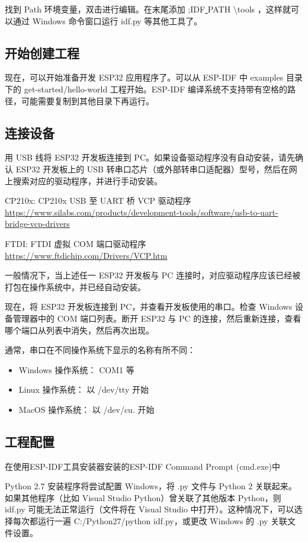 找到 Path 环境变量，双击进行编辑。在末尾添加 ;IDF\underline{ }PATH \backslash tools ，这样就可以通过 Windows 命令窗口运行 idf.py 等其他工具了。

\subsection{开始创建工程}

现在，可以开始准备开发 ESP32 应用程序了。可以从 ESP-IDF 中 examples 目录下的 get-started/hello-world 工程开始。ESP-IDF 编译系统不支持带有空格的路径，可能需要复制到其他目录下再运行。

\subsection{连接设备}

用 USB 线将 ESP32 开发板连接到 PC。如果设备驱动程序没有自动安装，请先确认 ESP32 开发板上的 USB 转串口芯片（或外部转串口适配器）型号，然后在网上搜索对应的驱动程序，并进行手动安装。

CP210x: CP210x USB 至 UART 桥 VCP 驱动程序 \url{https://www.silabs.com/products/development-tools/software/usb-to-uart-bridge-vcp-drivers}

FTDI: FTDI 虚拟 COM 端口驱动程序 \url{https://www.ftdichip.com/Drivers/VCP.htm}

一般情况下，当上述任一 ESP32 开发板与 PC 连接时，对应驱动程序应该已经被打包在操作系统中，并已经自动安装。

现在，将 ESP32 开发板连接到 PC，并查看开发板使用的串口。检查 Windows 设备管理器中的 COM 端口列表。断开 ESP32 与 PC 的连接，然后重新连接，查看哪个端口从列表中消失，然后再次出现。

通常，串口在不同操作系统下显示的名称有所不同：

\begin{itemize}
    \item Windows 操作系统： COM1 等
    \item Linux 操作系统： 以 /dev/tty 开始
    \item MacOS 操作系统： 以 /dev/cu. 开始
\end{itemize}


\subsection{工程配置}

在使用ESP-IDF工具安装器安装的ESP-IDF Command Prompt (cmd.exe)中

Python 2.7 安装程序将尝试配置 Windows，将 .py 文件与 Python 2 关联起来。如果其他程序（比如 Visual Studio Python）曾关联了其他版本 Python，则 idf.py 可能无法正常运行（文件将在 Visual Studio 中打开）。这种情况下，可以选择每次都运行一遍 C:/Python27/python idf.py，或更改 Windows 的 .py 关联文件设置。

